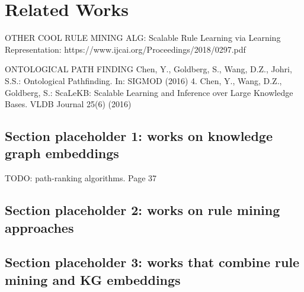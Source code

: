 \chapter{Related Works}

OTHER COOL RULE MINING ALG:
Scalable Rule Learning via Learning Representation:
https://www.ijcai.org/Proceedings/2018/0297.pdf



ONTOLOGICAL PATH FINDING
Chen, Y., Goldberg, S., Wang, D.Z., Johri, S.S.: Ontological Pathfinding. In: SIGMOD (2016) 
4. Chen, Y., Wang, D.Z., Goldberg, S.: ScaLeKB: Scalable Learning and Inference over Large Knowledge Bases. VLDB Journal 25(6) (2016)

\section{Section placeholder 1: works on knowledge graph embeddings}

TODO: path-ranking algorithms. Page 37

\section{Section placeholder 2: works on rule mining approaches}

\section{Section placeholder 3: works that combine rule mining and KG embeddings}